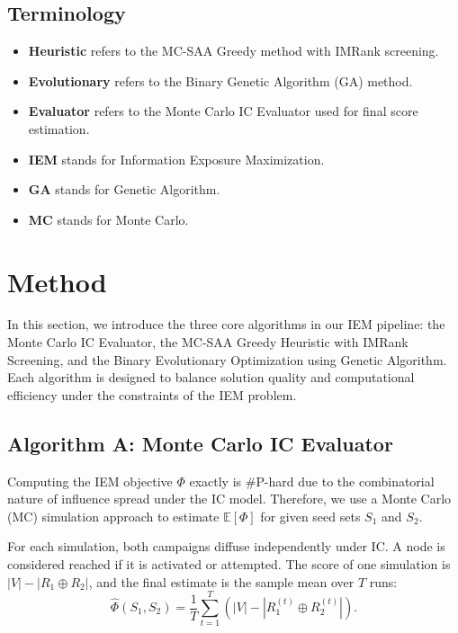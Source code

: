 \documentclass[onecolumn,a4paper,12pt]{IEEEtran}
\begin{document}
\subsection{Terminology} 

\begin{itemize}
        \item \textbf{Heuristic} refers to the MC-SAA Greedy method with IMRank screening.
        \item \textbf{Evolutionary} refers to the Binary Genetic Algorithm (GA) method.
        \item \textbf{Evaluator} refers to the Monte Carlo IC Evaluator used for final score estimation.
        \item \textbf{IEM} stands for Information Exposure Maximization.
        \item \textbf{GA} stands for Genetic Algorithm.
        \item \textbf{MC} stands for Monte Carlo.
\end{itemize}

\section{Method}

In this section, we introduce the three core algorithms in our IEM pipeline: the Monte Carlo IC Evaluator, the MC-SAA Greedy Heuristic with IMRank Screening, and the Binary Evolutionary Optimization using Genetic Algorithm. Each algorithm is designed to balance solution quality and computational efficiency under the constraints of the IEM problem.

\subsection{Algorithm A: Monte Carlo IC Evaluator}

Computing the IEM objective $\Phi$ exactly is \#P-hard due to the combinatorial nature of influence spread under the IC model. Therefore, we use a Monte Carlo (MC) simulation approach to estimate $\mathbb{E}[\Phi]$ for given seed sets $S_1$ and $S_2$.

For each simulation, both campaigns diffuse independently under IC. A node is considered reached if it is activated or attempted. The score of one simulation is $|V|-|R_1\oplus R_2|$, and the final estimate is the sample mean over $T$ runs:
\begin{equation}
\hat{\Phi}(S_1,S_2)=\frac{1}{T}\sum_{t=1}^{T}\left(|V|-|R_1^{(t)}\oplus R_2^{(t)}|\right).
\end{equation}
\end{document}
